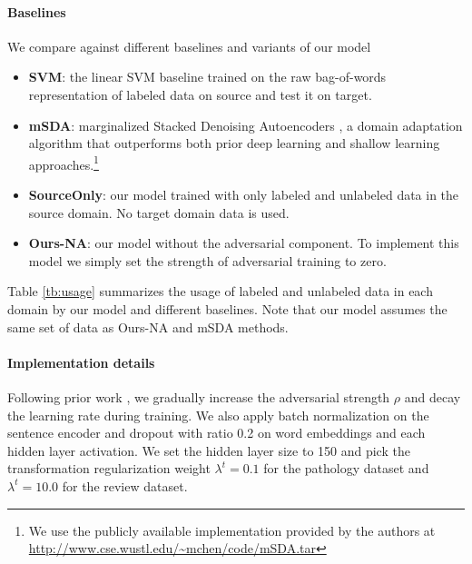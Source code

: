 \paragraph{Baselines} We compare against different baselines and variants of our model
\begin{itemize}[leftmargin=10pt,parsep=-4pt,topsep=0pt]

\item \textbf{SVM}: the linear SVM baseline trained on the raw bag-of-words representation of labeled data on source and test it on target.

\item \textbf{mSDA}: marginalized Stacked Denoising Autoencoders \cite{chen2012marginalized}, a domain adaptation algorithm that outperforms both prior deep learning and shallow learning approaches.\footnote{We use the publicly available implementation provided by the authors at \url{http://www.cse.wustl.edu/~mchen/code/mSDA.tar}}

\item \textbf{SourceOnly}: our model trained with only labeled and unlabeled data in the source domain. No target domain data is used.

\item \textbf{Ours-NA}: our model without the adversarial component. To implement this model we simply set the strength of adversarial training to zero.


\end{itemize}
Table \ref{tb:usage} summarizes the usage of labeled and unlabeled data in each domain by our model and different baselines. Note that our model assumes the same set of data as Ours-NA and mSDA methods.


\paragraph{Implementation details}
Following prior work \cite{ganin2014unsupervised}, we gradually increase the adversarial strength $\rho$ and decay the learning rate during training. We also apply batch normalization \cite{ioffe2015batch} on the sentence encoder and dropout with ratio 0.2 on word embeddings and each hidden layer activation. We set the hidden layer size to 150 and pick the transformation regularization weight $\lambda^{t}=0.1$ for the pathology dataset and $\lambda^{t}=10.0$ for the review dataset. 
